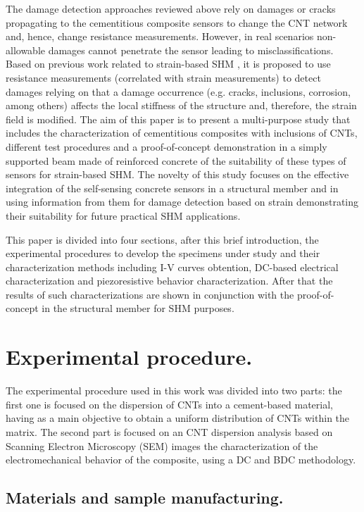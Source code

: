 \documentclass[twocolumn]{bmcart}%
\begin{document}
The damage detection approaches reviewed above rely on damages or cracks propagating to the cementitious composite sensors to change the CNT network and, hence, change resistance measurements. However, in real scenarios non-allowable damages cannot penetrate the sensor leading to misclassifications. Based on previous work related to strain-based SHM \cite{Sierra-Perez2015, Sierra-Perez2018}, it is proposed to use resistance measurements (correlated with strain measurements) to detect damages relying on that a damage occurrence (e.g. cracks, inclusions, corrosion, among others) affects the local stiffness of the structure and, therefore, the strain field is modified.  
The aim of this paper is to present a multi-purpose study that includes the characterization of cementitious composites with inclusions of CNTs, different test procedures and a proof-of-concept demonstration in a simply supported beam made of reinforced concrete of the suitability of these types of sensors for strain-based SHM. The novelty of this study focuses on the effective integration of the self-sensing concrete sensors in a structural member and in using information from them for damage detection based on strain demonstrating their suitability for future practical SHM applications.

This paper is divided into four sections, after this brief introduction, the experimental procedures to develop the specimens under study and their characterization methods including I-V curves obtention, DC-based electrical characterization and piezoresistive behavior characterization. After that the results of such characterizations are shown in conjunction with the proof-of-concept in the structural member for SHM purposes.


\section{Experimental procedure.}

The experimental procedure used in this work was divided into two parts: the first one is focused on the dispersion of CNTs into a cement-based material, having as a main objective to obtain a uniform distribution of CNTs within the matrix. The second part is focused on an CNT dispersion analysis based on Scanning Electron Microscopy (SEM) images the characterization of the electromechanical behavior of the composite, using a  DC and BDC methodology. 

\subsection{Materials and sample manufacturing.}
\end{document}
